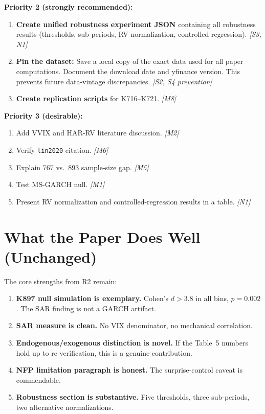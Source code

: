 \documentclass[12pt,a4paper]{article}
\begin{document}
\textbf{Priority 2 (strongly recommended):}
\begin{enumerate}[resume]
\item \textbf{Create unified robustness experiment JSON} containing all robustness results (thresholds, sub-periods, RV normalization, controlled regression). \textit{[S3, N1]}
\item \textbf{Pin the dataset:} Save a local copy of the exact data used for all paper computations. Document the download date and yfinance version. This prevents future data-vintage discrepancies. \textit{[S2, S4 prevention]}
\item \textbf{Create replication scripts} for K716--K721. \textit{[M8]}
\end{enumerate}

\textbf{Priority 3 (desirable):}
\begin{enumerate}[resume]
\item Add VVIX and HAR-RV literature discussion. \textit{[M2]}
\item Verify \texttt{lin2020} citation. \textit{[M6]}
\item Explain 767 vs.\ 893 sample-size gap. \textit{[M5]}
\item Test MS-GARCH null. \textit{[M1]}
\item Present RV normalization and controlled-regression results in a table. \textit{[N1]}
\end{enumerate}


\bigskip

\section*{What the Paper Does Well (Unchanged)}

The core strengths from R2 remain:
\begin{enumerate}
\item \textbf{K897 null simulation is exemplary.} Cohen's $d > 3.8$ in all bins, $p = 0.002$. The SAR finding is not a GARCH artifact.
\item \textbf{SAR measure is clean.} No VIX denominator, no mechanical correlation.
\item \textbf{Endogenous/exogenous distinction is novel.} If the Table~5 numbers hold up to re-verification, this is a genuine contribution.
\item \textbf{NFP limitation paragraph is honest.} The surprise-control caveat is commendable.
\item \textbf{Robustness section is substantive.} Five thresholds, three sub-periods, two alternative normalizations.
\end{enumerate}
\end{document}
